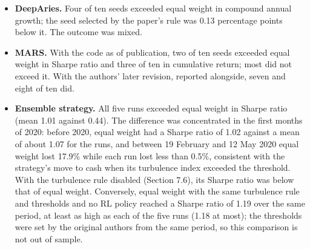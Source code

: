 \documentclass[12pt,a4paper]{report}
\providecommand{\tightlist}{\setlength{\itemsep}{0pt}\setlength{\parskip}{0pt}}
\begin{document}
\begin{itemize}
\tightlist
\item
  \textbf{DeepAries.} Four of ten seeds exceeded equal weight in
  compound annual growth; the seed selected by the paper's rule was 0.13
  percentage points below it. The outcome was mixed.
\item
  \textbf{MARS.} With the code as of publication, two of ten seeds
  exceeded equal weight in Sharpe ratio and three of ten in cumulative
  return; most did not exceed it. With the authors' later revision,
  reported alongside, seven and eight of ten did.
\item
  \textbf{Ensemble strategy.} All five runs exceeded equal weight in
  Sharpe ratio (mean 1.01 against 0.44). The difference was concentrated
  in the first months of 2020: before 2020, equal weight had a Sharpe
  ratio of 1.02 against a mean of about 1.07 for the runs, and between
  19 February and 12 May 2020 equal weight lost 17.9\% while each run
  lost less than 0.5\%, consistent with the strategy's move to cash when
  its turbulence index exceeded the threshold. With the turbulence rule
  disabled (Section 7.6), its Sharpe ratio was below that of equal
  weight. Conversely, equal weight with the same turbulence rule and
  thresholds and no RL policy reached a Sharpe ratio of 1.19 over the
  same period, at least as high as each of the five runs (1.18 at most);
  the thresholds were set by the original authors from the same period,
  so this comparison is not out of sample.
\end{itemize}
\end{document}

